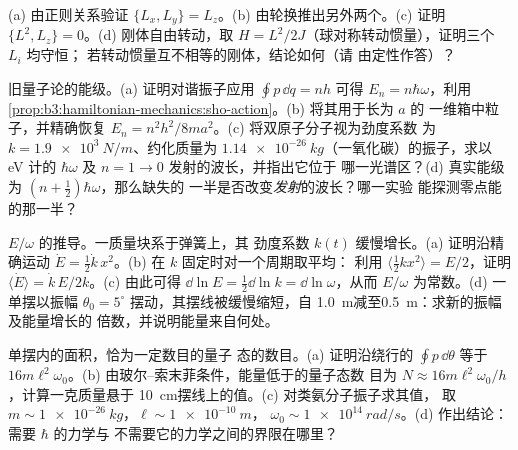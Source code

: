 \begin{exercise}[$\star\star$]\label{exo:b3:hamiltonian-mechanics:9}
(a) 由正则关系验证 $\{L_x, L_y\} = L_z$。(b)
由轮换推出另外两个。(c) 证明
$\{L^2, L_z\} = 0$。(d) 刚体自由转动，取 $H =
L^2/2J$（球对称转动惯量），证明三个 $L_i$ 均守恒；
若转动惯量互不相等的刚体，结论如何（请
由定性作答）？
\end{exercise}

\begin{exercise}[$\star\star\star$]\label{exo:b3:hamiltonian-mechanics:10}
旧量子论的能级。(a) 证明对谐振子应用 $\oint p\,\dd q = nh$
可得 $E_n = n\hbar\omega$，利用
\cref{prop:b3:hamiltonian-mechanics:sho-action}。(b) 将其用于长为 $a$ 的
一维箱中粒子，并精确恢复 $E_n =
n^2h^2/8ma^2$。(c) 将双原子分子视为劲度系数
为 $k = \qty{1.9e3}{N/m}$、约化质量为 $\qty{1.14e-26}
{kg}$（一氧化碳）的振子，求以 eV 计的 $\hbar\omega$ 及
$n = 1 \to 0$ 发射的波长，并指出它位于
哪一光谱区？(d) 真实能级为 $(n + \tfrac12)\hbar\omega$，那么缺失的
一半是否改变\emph{发射}的波长？哪一实验
能探测零点能的那一半？
\end{exercise}

\begin{exercise}[$\star\star\star$]\label{exo:b3:hamiltonian-mechanics:11}
 $E/\omega$ 的推导。一质量块系于弹簧上，其
劲度系数 $k(t)$ 缓慢增长。(a) 证明沿精确运动 $\dot E = \tfrac12\dot k\,
x^2$。(b) 在 $k$ 固定时对一个周期取平均：
利用 $\langle\tfrac12 kx^2\rangle = E/2$，证明 $\langle\dot E\rangle
= \dot k\,E/2k$。(c) 由此可得 $\dd\ln E = \tfrac12\dd\ln k = \dd\ln
\omega$，从而 $E/\omega$ 为常数。(d) 一单摆以振幅
$\theta_0 = 5^\circ$ 摆动，其摆线被缓慢缩短，自
\qty{1.0}{m}减至\qty{0.5}{m}：求新的振幅及能量增长的
倍数，并说明能量来自何处。
\end{exercise}

\begin{exercise}[$\star\star\star$]\label{exo:b3:hamiltonian-mechanics:12}
单摆内的面积，恰为一定数目的量子
态的数目。(a) 证明沿绕行的 $\oint p\,\dd\theta$ 等于
$16m\ell^2\omega_0$。(b) 由玻尔–索末菲条件，能量低于的量子态数
目为 $N \approx
16m\ell^2\omega_0/h$，计算一克质量悬于
\qty{10}{cm}摆线上的值。(c) 对类氨分子振子求其值，
取 $m \sim \qty{1e-26}{kg}$，$\ell \sim \qty{1e-10}{m}$，
$\omega_0 \sim \qty{1e14}{rad/s}$。(d) 作出结论：需要 $\hbar$ 的力学与
不需要它的力学之间的界限在哪里？
\end{exercise}

